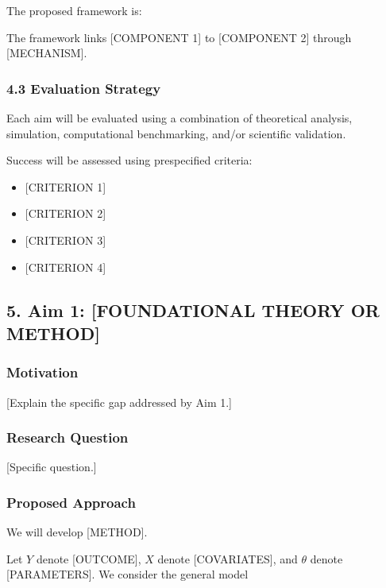\documentclass[
  11pt,
  letterpaper,
]{article}
\providecommand{\tightlist}{%
  \setlength{\itemsep}{0pt}\setlength{\parskip}{0pt}}\usepackage{longtable,booktabs,array}
\begin{document}
The proposed framework is:

The framework links {[}COMPONENT 1{]} to {[}COMPONENT 2{]} through
{[}MECHANISM{]}.

\subsubsection{4.3 Evaluation Strategy}\label{evaluation-strategy}

Each aim will be evaluated using a combination of theoretical analysis,
simulation, computational benchmarking, and/or scientific validation.

Success will be assessed using prespecified criteria:

\begin{itemize}
\tightlist
\item
  {[}CRITERION 1{]}
\item
  {[}CRITERION 2{]}
\item
  {[}CRITERION 3{]}
\item
  {[}CRITERION 4{]}
\end{itemize}

\subsection{5. Aim 1: {[}FOUNDATIONAL THEORY OR
METHOD{]}}\label{aim-1-foundational-theory-or-method}

\subsubsection{Motivation}\label{motivation}

{[}Explain the specific gap addressed by Aim 1.{]}

\subsubsection{Research Question}\label{research-question}

{[}Specific question.{]}

\subsubsection{Proposed Approach}\label{proposed-approach}

We will develop {[}METHOD{]}.

Let \(Y\) denote {[}OUTCOME{]}, \(X\) denote {[}COVARIATES{]}, and
\(\theta\) denote {[}PARAMETERS{]}. We consider the general model
\end{document}
